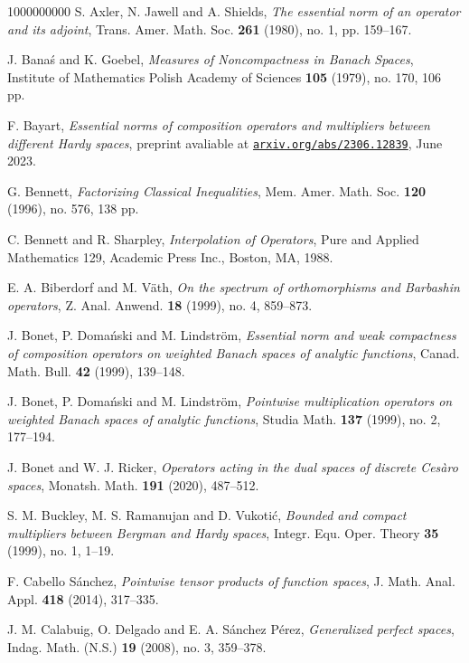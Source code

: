 \documentclass[11pt]{amsart}
\theoremstyle{definition}
\theoremstyle{definition}
\theoremstyle{definition}
\theoremstyle{definition}
\theoremstyle{definition}
\theoremstyle{definition}
\theoremstyle{definition}
\theoremstyle{definition}
\numberwithin{equation}{section}
\numberwithin{equation}{section}
\numberwithin{equation}{section}
\theoremstyle{definition}
\theoremstyle{definition}
\theoremstyle{definition}
\theoremstyle{definition}
\theoremstyle{definition}
\theoremstyle{definition}
\begin{document}
\begin{thebibliography}{1000000000}
	 S. Axler, N. Jawell and A. Shields, {\it The essential norm of an operator and its adjoint}, Trans. Amer. Math. Soc. {\bf 261} (1980), no. 1, pp. 159--167.
	
	 J. Bana{\' s} and K. Goebel, {\it Measures of Noncompactness in Banach Spaces}, Institute of Mathematics Polish Academy of Sciences {\bf 105} (1979), no. 170, 106 pp.
	
	 F. Bayart, {\it Essential norms of composition operators and multipliers between different Hardy spaces}, preprint
	 avaliable at \href{https:/https://arxiv.org/abs/2306.12839.pdf}{\texttt{arxiv.org/abs/2306.12839}}, June 2023.

	 G. Bennett, \textit{Factorizing Classical Inequalities}, Mem. Amer. Math. Soc. {\bf 120} (1996), no. 576, 138 pp.
	
	 C. Bennett and R. Sharpley, \textit{Interpolation of Operators}, Pure and Applied Mathematics 129, Academic Press Inc., Boston, MA, 1988.
	
	 E. A. Biberdorf and M. V{\" a}th, {\it On the spectrum of orthomorphisms and Barbashin operators}, Z. Anal. Anwend. {\bf 18} (1999), no. 4, 859--873.
	
	 J. Bonet, P. Doma{\' n}ski and M. Lindstr{\" o}m, {\it Essential norm and weak compactness of composition operators on weighted Banach spaces
		of analytic functions}, Canad. Math. Bull. {\bf 42} (1999), 139--148.
	
	 J. Bonet, P. Doma{\' n}ski and M. Lindstr{\" o}m, {\it Pointwise multiplication operators on weighted Banach spaces of analytic functions},
		Studia Math. {\bf 137} (1999), no. 2, 177--194.
		
	 J. Bonet and W. J. Ricker, {\it Operators acting in the dual spaces of discrete Ces{\` a}ro spaces}, Monatsh. Math. {\bf 191} (2020), 487--512.
	
	 S. M. Buckley, M. S. Ramanujan and D. Vukoti{\' c}, {\it Bounded and compact multipliers between Bergman and Hardy spaces},
		Integr. Equ. Oper. Theory {\bf 35} (1999), no. 1, 1--19.
	
	 F. Cabello S{\' a}nchez, {\it Pointwise tensor products of function spaces}, J. Math. Anal. Appl. {\bf 418} (2014), 317--335.
	
	 J. M. Calabuig, O. Delgado and E. A. S{\' a}nchez P{\' e}rez, {\it Generalized perfect spaces}, Indag. Math. (N.S.) {\bf 19} (2008),
		no. 3, 359--378.
		

\end{thebibliography}
\end{document}

